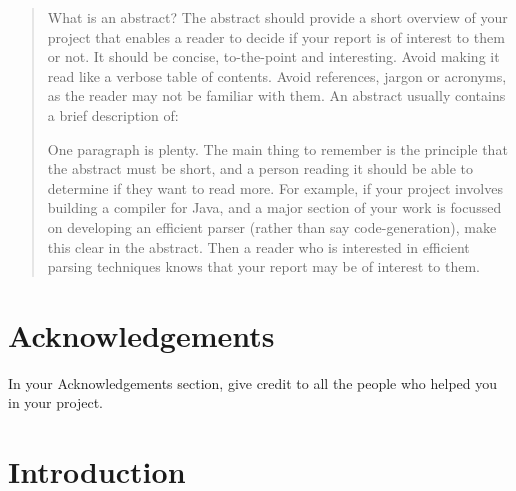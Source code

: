 \documentclass[]{final_report}
\begin{document}
\maketitle
\tableofcontents{}\newpage


\begin{abstract}

What is an abstract? The abstract should provide a short overview of your project that enables a reader to decide if your report is of interest to them or not. It should be concise, to-the-point and interesting. Avoid making it read like a verbose table of contents. Avoid references, jargon or acronyms, as the reader may not be familiar with them. An abstract usually contains a brief description of:


One paragraph is plenty. The main thing to remember is the principle that the abstract must be short, and a person reading it should be able to determine if they want to read more. For example, if your project involves building a compiler for Java, and a major section of your work is focussed on developing an efficient parser (rather than say code-generation), make this clear in the abstract. Then a reader who is interested in efficient parsing techniques knows that your report may be of interest to them.

\end{abstract}
\newpage



\chapter*{Acknowledgements}

In your Acknowledgements section, give credit to all the people who helped you in your project.


\chapter{Introduction}
\end{document}
